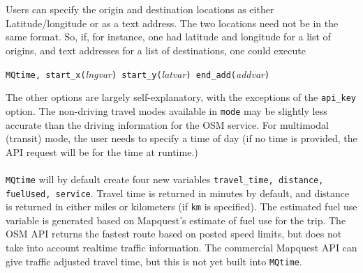 \documentclass[12pt]{article}
\begin{document}
\\ \\
Users can specify the origin and destination locations as either Latitude/longitude or as a text address. The two locations need not be in the same format. So, if, for instance, one had latitude and longitude for a list of origins, and text addresses for a list of destinations, one could execute
\begin{center}
\verb|MQtime, start_x(|\textit{lngvar}\verb|) start_y(|\textit{latvar}\verb|) end_add(|\textit{addvar}\verb|)|
\end{center}
The other options are largely self-explanatory, with the exceptions of the \verb|api_key| option. The non-driving travel modes available in \verb|mode| may be slightly less accurate than the driving information for the OSM service. For multimodal (transit) mode, the user needs to specify a time of day (if no time is provided, the API request will be for the time at runtime.)
\\ \\
\verb|MQtime| will by default create four new variables \verb|travel_time, distance, fuelUsed, service|. Travel time is returned in minutes by default, and distance is returned in either miles or kilometers (if \verb|km| is specified). The estimated fuel use variable is generated based on Mapquest's estimate of fuel use for the trip. The OSM API returns the fastest route based on posted speed limits, but does not take into account realtime traffic information. The commercial Mapquest API can give traffic adjusted travel time, but this is not yet built into \verb|MQtime|.
\end{document}
